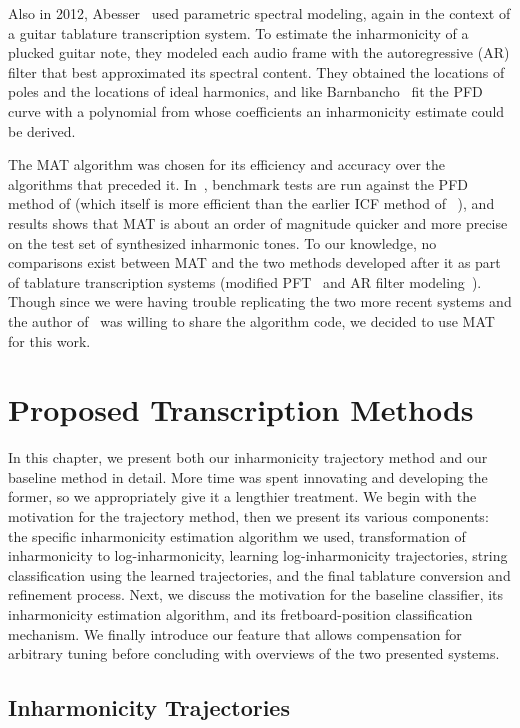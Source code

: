 \documentclass[12pt]{cmuthesis}
\begin{document}
Also in 2012, Abesser~\cite{abesser2012} used parametric spectral modeling, again in the context of a guitar tablature transcription system. To estimate the inharmonicity of a plucked guitar note, they modeled each audio frame with the autoregressive (AR) filter that best approximated its spectral content. They obtained the locations of poles and the locations of ideal harmonics, and like Barnbancho~\cite{barbanchoi2012} fit the PFD curve with a polynomial from whose coefficients an inharmonicity estimate could be derived.

The MAT algorithm was chosen for its efficiency and accuracy over the algorithms that preceded it. In~\cite{hodgkinson2009}, benchmark tests are run against the PFD method of \cite{rauhala2007} (which itself is more efficient than the earlier ICF method of ~\cite{galembo1999}), and results shows that MAT is about an order of magnitude quicker and more precise on the test set of synthesized inharmonic tones. To our knowledge, no comparisons exist between MAT and the two methods developed after it as part of tablature transcription systems (modified PFT~\cite{barbanchoi2012} and AR filter modeling~\cite{abesser2012}). Though since we were having trouble replicating the two more recent systems and the author of~\cite{hodgkinson2009} was willing to share the algorithm code, we decided to use MAT for this work.

\noindent
\chapter{Proposed Transcription Methods}
\label{chap:method}
In this chapter, we present both our inharmonicity trajectory method and our baseline method in detail. More time was spent innovating and developing the former, so we appropriately give it a lengthier treatment. We begin with the motivation for the trajectory method, then we present its various components: the specific inharmonicity estimation algorithm we used, transformation of inharmonicity to log-inharmonicity, learning log-inharmonicity trajectories, string classification using the learned trajectories, and the final tablature conversion and refinement process. Next, we discuss the motivation for the baseline classifier, its inharmonicity estimation algorithm, and its fretboard-position classification mechanism. We finally introduce our feature that allows compensation for arbitrary tuning before concluding with overviews of the two presented systems.

\section{Inharmonicity Trajectories}
\end{document}
